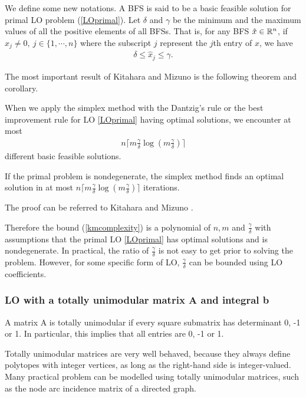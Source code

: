 \documentclass[11pt]{article}
\begin{document}
We define some new notations. A BFS is said to be a basic feasible solution for primal LO problem (\ref{LOprimal}). Let $\delta$ and $\gamma$ be the minimum and the maximum values of all the positive elements of all BFSs. That is, for any BFS $\hat{x} \in \mathbb{R}^{n}$, if $\hat{x}_j \neq 0, \ j \in \{1, \cdots, n\}$ where the subscript $j$ represent the $j$th entry of $\hat{x}$, we have 
\begin{align}
\delta \le \hat{x}_j \le \gamma. \label{eq:bfsbound}
\end{align} 

The most important result of Kitahara and Mizuno \cite{kitahara2013bound} is the following theorem and corollary.
\begin{theorem}
When we apply the simplex method with the Dantzig's rule or the best improvement rule for LO \ref{LOprimal} having optimal solutions, we encounter at most
\begin{align}
n\lceil m \frac{\gamma}{\delta}\log(m\frac{\gamma}{\delta})\rceil \label{kmcomplexity}
\end{align}
different basic feasible solutions. \label{KTheorem1}
\end{theorem}

\begin{corollary}
 If the primal problem is nondegenerate, the simplex method finds an optimal solution in at most $n\lceil m \frac{\gamma}{\delta}\log(m\frac{\gamma}{\delta})\rceil$ iterations.
\end{corollary}
The proof can be referred to Kitahara and Mizuno \cite{kitahara2013bound}. 

Therefore the bound (\ref{kmcomplexity}) is a polynomial of $n, m$ and $\frac{\gamma}{\delta}$ with assumptions that the primal LO \ref{LOprimal} has optimal solutions and is nondegenerate. In practical, the ratio of $\frac{\gamma}{\delta}$ is not easy to get prior to solving the problem. However, for some specific form of LO, $\frac{\gamma}{\delta}$ can be bounded using  LO coefficients. 
\subsubsection{LO with a totally unimodular matrix A and integral b}
\begin{definition}
A matrix A is totally unimodular if every square submatrix has determinant 0, -1 or 1. In particular, this implies that all entries are 0, -1 or 1.
\end{definition}
Totally unimodular matrices are very well behaved, because they always define polytopes with integer vertices, as long as the right-hand side is integer-valued. Many practical problem can be modelled using totally unimodular matrices, such as the node arc incidence matrix of a directed graph.
\end{document}
